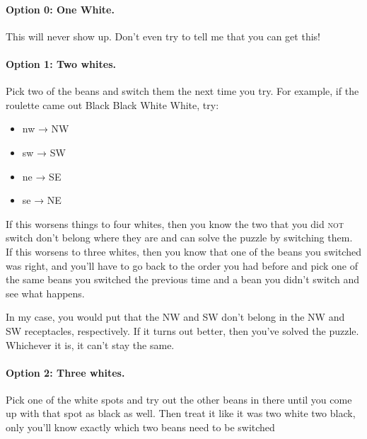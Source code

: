 \documentclass[11pt,twoside,openright]{report}
\providecommand{\tightlist}{%
  \setlength{\itemsep}{0pt}\setlength{\parskip}{0pt}}
\let\oldparagraph\paragraph
\renewcommand{\paragraph}[1]{\oldparagraph{#1}\mbox{}\nopagebreak}
\newcommand\textlcsc[1]{\texorpdfstring{\textsc{\MakeLowercase{#1}}}{#1}}
\begin{document}
\paragraph{Option 0: One White.} This will never show up. Don't even try to
tell me that you can get this!

\paragraph{Option 1: Two whites.} Pick two of the beans and switch them the
next time you try. For example, if the roulette came out Black Black White
White, try:%
%
\begin{itemize}
\tightlist
\item
  nw → NW
\item
  sw → SW
\item
  ne → SE
\item
  se → NE
\end{itemize}

If this worsens things to four whites, then you know the two that you did
\textlcsc{NOT} switch don't belong where they are and can solve the puzzle by
switching them. If this worsens to three whites, then you know that one of
the beans you switched was right, and you'll have to go back to the order you
had before and pick one of the same beans you switched the previous time and
a bean you didn't switch and see what happens.

In my case, you would put that the NW and SW don't belong in the NW and SW
receptacles, respectively. If it turns out better, then you've solved the
puzzle. Whichever it is, it can't stay the same.

\paragraph{Option 2: Three whites.} Pick one of the white spots and try out
the other beans in there until you come up with that spot as black as
well. Then treat it like it was two white two black, only you'll know exactly
which two beans need to be switched
\end{document}
